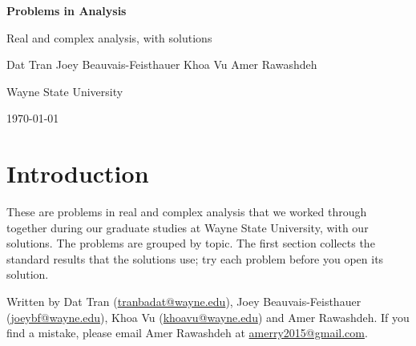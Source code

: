 \documentclass[11pt]{article}
\begin{document}
\begin{titlepage}\centering\vspace*{1.6in}
{\Huge\bfseries Problems in Analysis\par}\vspace{14pt}
{\Large Real and complex analysis, with solutions\par}\vspace{40pt}
{\large Dat Tran \quad Joey Beauvais-Feisthauer \quad Khoa Vu \quad Amer Rawashdeh\par}\vspace{8pt}
{\normalsize Wayne State University\par}\vspace{8pt}
{\normalsize\today\par}\vfill
\end{titlepage}

\section*{Introduction}
These are problems in real and complex analysis that we worked through together during our graduate studies at Wayne State University, with our solutions. The problems are grouped by topic. The first section collects the standard results that the solutions use; try each problem before you open its solution.

Written by Dat Tran (\href{mailto:tranbadat@wayne.edu}{tranbadat@wayne.edu}), Joey Beauvais-Feisthauer (\href{mailto:joeybf@wayne.edu}{joeybf@wayne.edu}), Khoa Vu (\href{mailto:khoavu@wayne.edu}{khoavu@wayne.edu}) and Amer Rawashdeh. If you find a mistake, please email Amer Rawashdeh at \href{mailto:amerry2015@gmail.com}{amerry2015@gmail.com}.

\tableofcontents
\newpage











\end{document}
